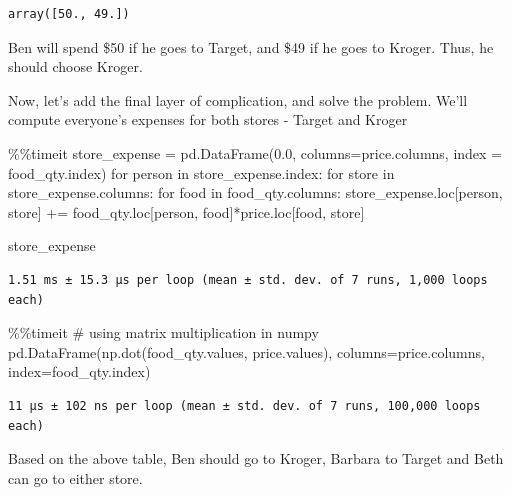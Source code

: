 \documentclass[
  letterpaper,
  DIV=11,
  numbers=noendperiod]{scrreprt}
\newenvironment{Shaded}{\begin{snugshade}}{\end{snugshade}}
\newcommand{\CommentTok}[1]{\textcolor[rgb]{0.37,0.37,0.37}{#1}}
\newcommand{\ControlFlowTok}[1]{\textcolor[rgb]{0.00,0.23,0.31}{#1}}
\newcommand{\FloatTok}[1]{\textcolor[rgb]{0.68,0.00,0.00}{#1}}
\newcommand{\KeywordTok}[1]{\textcolor[rgb]{0.00,0.23,0.31}{#1}}
\newcommand{\NormalTok}[1]{\textcolor[rgb]{0.00,0.23,0.31}{#1}}
\newcommand{\OperatorTok}[1]{\textcolor[rgb]{0.37,0.37,0.37}{#1}}
\begin{document}
\begin{verbatim}
array([50., 49.])
\end{verbatim}

Ben will spend \$50 if he goes to Target, and \$49 if he goes to Kroger.
Thus, he should choose Kroger.

Now, let's add the final layer of complication, and solve the problem.
We'll compute everyone's expenses for both stores - Target and Kroger

\begin{Shaded}
\begin{Highlighting}[]
\OperatorTok{\%\%}\NormalTok{timeit}
\NormalTok{store\_expense }\OperatorTok{=}\NormalTok{ pd.DataFrame(}\FloatTok{0.0}\NormalTok{, columns}\OperatorTok{=}\NormalTok{price.columns, index }\OperatorTok{=}\NormalTok{ food\_qty.index)}
\ControlFlowTok{for}\NormalTok{ person }\KeywordTok{in}\NormalTok{ store\_expense.index:}
    \ControlFlowTok{for}\NormalTok{ store }\KeywordTok{in}\NormalTok{ store\_expense.columns:}
        \ControlFlowTok{for}\NormalTok{ food }\KeywordTok{in}\NormalTok{ food\_qty.columns:}
\NormalTok{            store\_expense.loc[person, store] }\OperatorTok{+=}\NormalTok{ food\_qty.loc[person, food]}\OperatorTok{*}\NormalTok{price.loc[food, store]}

\NormalTok{store\_expense}
\end{Highlighting}
\end{Shaded}

\begin{verbatim}
1.51 ms ± 15.3 μs per loop (mean ± std. dev. of 7 runs, 1,000 loops each)
\end{verbatim}

\begin{Shaded}
\begin{Highlighting}[]
\OperatorTok{\%\%}\NormalTok{timeit}
\CommentTok{\# using matrix multiplication in numpy}
\NormalTok{pd.DataFrame(np.dot(food\_qty.values, price.values), columns}\OperatorTok{=}\NormalTok{price.columns, index}\OperatorTok{=}\NormalTok{food\_qty.index)}
\end{Highlighting}
\end{Shaded}

\begin{verbatim}
11 μs ± 102 ns per loop (mean ± std. dev. of 7 runs, 100,000 loops each)
\end{verbatim}

Based on the above table, Ben should go to Kroger, Barbara to Target and
Beth can go to either store.
\end{document}
